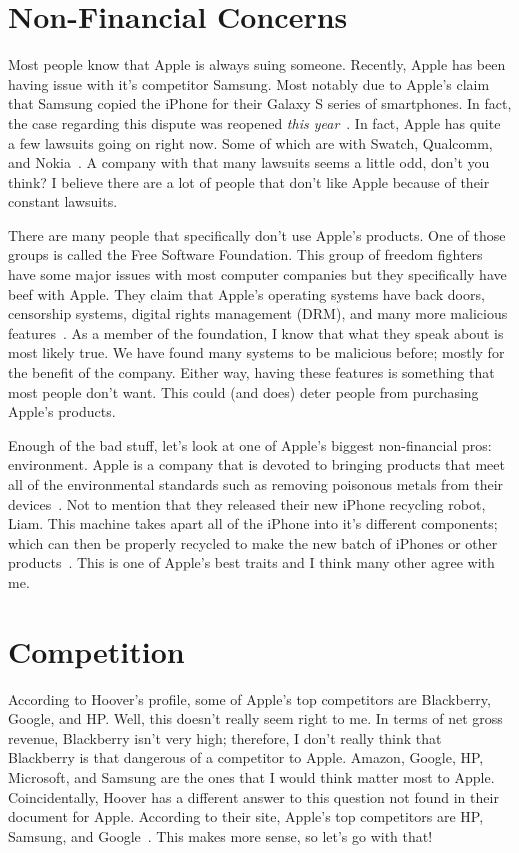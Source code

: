 \documentclass[12pt,a4paper,titlepage]{article}
\begin{document}
\newpage

\section{Non-Financial Concerns}
Most people know that Apple is always suing someone. Recently, Apple has been
having issue with it's competitor Samsung. Most notably due to Apple's claim
that Samsung copied the iPhone for their Galaxy S series of smartphones. In
fact, the case regarding this dispute was reopened \emph{this
  year}~\cite{sue}. In fact, Apple has quite a few lawsuits going on right
now. Some of which are with Swatch, Qualcomm, and Nokia~\cite{insider}. A
company with that many lawsuits seems a little odd, don't you think? I believe
there are a lot of people that don't like Apple because of their constant
lawsuits.

There are many people that specifically don't use Apple's products.  One of
those groups is called the Free Software Foundation. This group of freedom
fighters have some major issues with most computer companies but they
specifically have beef with Apple. They claim that Apple's operating systems
have back doors, censorship systems, digital rights management (DRM), and many
more malicious features~\cite{gnu}. As a member of the foundation, I know that
what they speak about is most likely true. We have found many systems to be
malicious before; mostly for the benefit of the company. Either way, having
these features is something that most people don't want. This could (and does)
deter people from purchasing Apple's products.

Enough of the bad stuff, let's look at one of Apple's biggest non-financial
pros: environment. Apple is a company that is devoted to bringing products that
meet all of the environmental standards such as removing poisonous metals from
their devices~\cite{apple-green}. Not to mention that they released their new
iPhone recycling robot, Liam. This machine takes apart all of the iPhone into
it's different components; which can then be properly recycled to make the new
batch of iPhones or other products~\cite{apple-green}. This is one of Apple's
best traits and I think many other agree with me.

\newpage

\section{Competition}
According to Hoover's profile, some of Apple's top competitors are Blackberry,
Google, and HP. Well, this doesn't really seem right to me. In terms of net
gross revenue, Blackberry isn't very high; therefore, I don't really think that
Blackberry is that dangerous of a competitor to Apple. Amazon, Google, HP,
Microsoft, and Samsung are the ones that I would think matter most to
Apple. Coincidentally, Hoover has a different answer to this question not found
in their document for Apple. According to their site, Apple's top competitors
are HP, Samsung, and Google~\cite{hoover-com}. This makes more sense, so let's
go with that!
\end{document}
